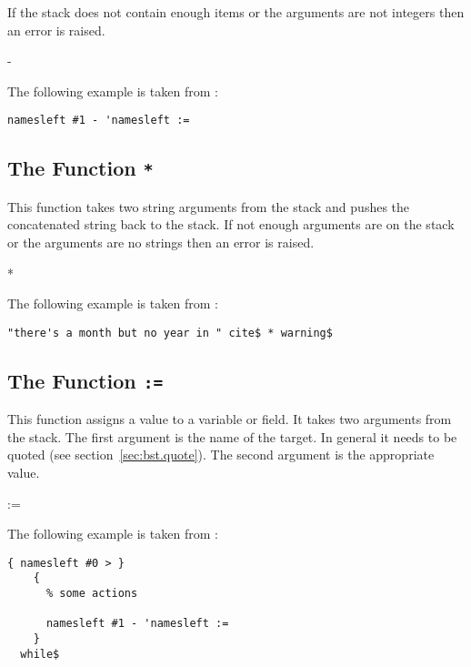 If the stack does not contain enough items or the arguments are not
integers then an error is raised.

\begin{BstFunction}{-}
\end{BstFunction}

The following example is taken from :

\begin{lstlisting}[language=bst]
  namesleft #1 - 'namesleft :=
\end{lstlisting}\fctIndex{-}\fctIndex{:=}


\subsection{The Function \texttt{*}}%
\fctIndex{*}

This function takes two string arguments from the stack and pushes the
concatenated string back to the stack. If not enough arguments are on
the stack or the arguments are no strings then an error is raised.

\begin{BstFunction}{*}
\end{BstFunction}

The following example is taken from :

\begin{lstlisting}[language=bst]
  "there's a month but no year in " cite$ * warning$
\end{lstlisting}


\subsection{The Function \texttt{:=}}%
\fctIndex{:=}

This function assigns a value to a variable or field. It takes two
arguments from the stack. The first argument is the name of the
target. In general it needs to be quoted (see
section~\ref{sec:bst.quote}). The second argument is the appropriate
value.

\begin{BstFunction}{:=}
\end{BstFunction}

The following example is taken from :

\begin{lstlisting}[language=bst]
    { namesleft #0 > }
    { 
      % some actions

      namesleft #1 - 'namesleft :=
    }
  while$
\end{lstlisting}\fctIndex{>}\fctIndex{-}\fctIndex{:=}


